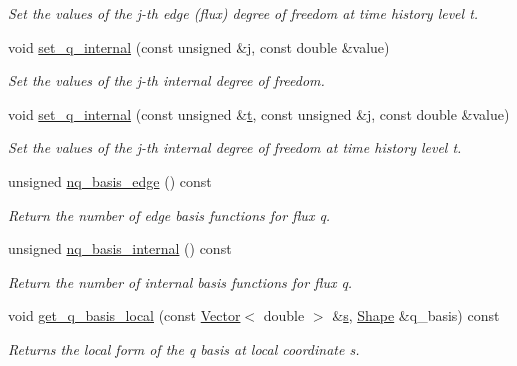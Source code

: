 \begin{DoxyCompactItemize}
\begin{DoxyCompactList}\small\item\em Set the values of the j-\/th edge (flux) degree of freedom at time history level t. \end{DoxyCompactList}\item 
void \hyperlink{classoomph_1_1TAxisymmetricPoroelasticityElement_a7c5a9c57e9cbbe808b42ebe9aa727014}{set\+\_\+q\+\_\+internal} (const unsigned \&j, const double \&value)
\begin{DoxyCompactList}\small\item\em Set the values of the j-\/th internal degree of freedom. \end{DoxyCompactList}\item 
void \hyperlink{classoomph_1_1TAxisymmetricPoroelasticityElement_a00e8333ce5109b945075ebe1b355c742}{set\+\_\+q\+\_\+internal} (const unsigned \&\hyperlink{cfortran_8h_af6f0bd3dc13317f895c91323c25c2b8f}{t}, const unsigned \&j, const double \&value)
\begin{DoxyCompactList}\small\item\em Set the values of the j-\/th internal degree of freedom at time history level t. \end{DoxyCompactList}\item 
unsigned \hyperlink{classoomph_1_1TAxisymmetricPoroelasticityElement_a55279875613735471b7b925116e85292}{nq\+\_\+basis\+\_\+edge} () const
\begin{DoxyCompactList}\small\item\em Return the number of edge basis functions for flux q. \end{DoxyCompactList}\item 
unsigned \hyperlink{classoomph_1_1TAxisymmetricPoroelasticityElement_adab98934a20e65055bdc477824c8c5ef}{nq\+\_\+basis\+\_\+internal} () const
\begin{DoxyCompactList}\small\item\em Return the number of internal basis functions for flux q. \end{DoxyCompactList}\item 
void \hyperlink{classoomph_1_1TAxisymmetricPoroelasticityElement_a77621158dba7ea8d2095e4162c76583c}{get\+\_\+q\+\_\+basis\+\_\+local} (const \hyperlink{classoomph_1_1Vector}{Vector}$<$ double $>$ \&\hyperlink{cfortran_8h_ab7123126e4885ef647dd9c6e3807a21c}{s}, \hyperlink{classoomph_1_1Shape}{Shape} \&q\+\_\+basis) const
\begin{DoxyCompactList}\small\item\em Returns the local form of the q basis at local coordinate s. \end{DoxyCompactList}\item 

\end{DoxyCompactItemize}
